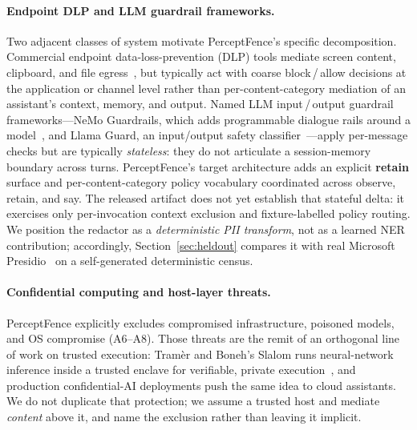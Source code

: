 \documentclass[pdflatex,sn-mathphys-num]{sn-jnl}
\begin{document}
\paragraph{Endpoint DLP and LLM guardrail frameworks.}
Two adjacent classes of system motivate PerceptFence's specific decomposition.
Commercial endpoint data-loss-prevention (DLP) tools mediate screen content,
clipboard, and file egress~\cite{alneyadi2016dlp}, but typically act with coarse block\,/\,allow
decisions at the application or channel level rather than per-content-category
mediation of an assistant's context, memory, and output. Named LLM
input\,/\,output guardrail frameworks---NeMo Guardrails, which adds programmable
dialogue rails around a model~\cite{rebedea2023nemo}, and Llama Guard, an
input/output safety classifier~\cite{inan2023llamaguard}---apply per-message
checks but are typically \textit{stateless}: they do not articulate a
session-memory boundary across turns. PerceptFence's target architecture adds
an explicit \textbf{retain} surface and per-content-category policy vocabulary
coordinated across observe, retain, and say. The released artifact does not yet
establish that stateful delta: it exercises only per-invocation context exclusion
and fixture-labelled policy routing. We position the redactor as a
\textit{deterministic PII transform}, not as a learned NER contribution;
accordingly, Section~\ref{sec:heldout} compares it with real Microsoft
Presidio~\cite{microsoft_presidio} on a self-generated deterministic census.

\paragraph{Confidential computing and host-layer threats.}
PerceptFence explicitly excludes compromised infrastructure, poisoned models,
and OS compromise (A6--A8). Those threats are the remit of an orthogonal line of
work on trusted execution: Tram\`er and Boneh's Slalom runs neural-network
inference inside a trusted enclave for verifiable, private
execution~\cite{tramer2019slalom}, and production confidential-AI deployments
push the same idea to cloud assistants. We do not duplicate that protection; we
assume a trusted host and mediate \textit{content} above it, and name the
exclusion rather than leaving it implicit.
\end{document}
